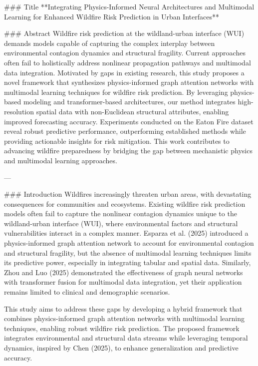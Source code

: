 ### Title  
**Integrating Physics-Informed Neural Architectures and Multimodal Learning for Enhanced Wildfire Risk Prediction in Urban Interfaces**  

### Abstract  
Wildfire risk prediction at the wildland-urban interface (WUI) demands models capable of capturing the complex interplay between environmental contagion dynamics and structural fragility. Current approaches often fail to holistically address nonlinear propagation pathways and multimodal data integration. Motivated by gaps in existing research, this study proposes a novel framework that synthesizes physics-informed graph attention networks with multimodal learning techniques for wildfire risk prediction. By leveraging physics-based modeling and transformer-based architectures, our method integrates high-resolution spatial data with non-Euclidean structural attributes, enabling improved forecasting accuracy. Experiments conducted on the Eaton Fire dataset reveal robust predictive performance, outperforming established methods while providing actionable insights for risk mitigation. This work contributes to advancing wildfire preparedness by bridging the gap between mechanistic physics and multimodal learning approaches.  

---

### Introduction  
Wildfires increasingly threaten urban areas, with devastating consequences for communities and ecosystems. Existing wildfire risk prediction models often fail to capture the nonlinear contagion dynamics unique to the wildland-urban interface (WUI), where environmental factors and structural vulnerabilities interact in a complex manner. Esparza et al. (2025) introduced a physics-informed graph attention network to account for environmental contagion and structural fragility, but the absence of multimodal learning techniques limits its predictive power, especially in integrating tabular and spatial data. Similarly, Zhou and Luo (2025) demonstrated the effectiveness of graph neural networks with transformer fusion for multimodal data integration, yet their application remains limited to clinical and demographic scenarios.  

This study aims to address these gaps by developing a hybrid framework that combines physics-informed graph attention networks with multimodal learning techniques, enabling robust wildfire risk prediction. The proposed framework integrates environmental and structural data streams while leveraging temporal dynamics, inspired by Chen (2025), to enhance generalization and predictive accuracy.  

